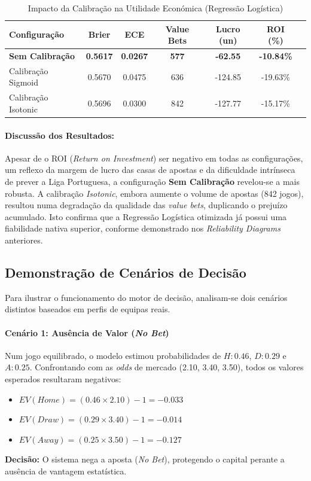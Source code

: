 \documentclass[10pt]{article}
\begin{document}
\begin{table}[H]
\centering
\caption{Impacto da Calibração na Utilidade Económica (Regressão Logística)}
\label{tab:utilidade_comparativa}
\begin{tabular}{lcccccc}
\hline
\textbf{Configuração} & \textbf{Brier} & \textbf{ECE} & \textbf{Value Bets} & \textbf{Lucro (un)} & \textbf{ROI (\%)} \\ \hline
\textbf{Sem Calibração} & \textbf{0.5617} & \textbf{0.0267} & \textbf{577} & \textbf{-62.55} & \textbf{-10.84\%} \\
Calibração Sigmoid & 0.5670 & 0.0475 & 636 & -124.85 & -19.63\% \\
Calibração Isotonic & 0.5696 & 0.0300 & 842 & -127.77 & -15.17\% \\ \hline
\end{tabular}
\end{table}

\paragraph{Discussão dos Resultados:} 
Apesar de o ROI (\textit{Return on Investment}) ser negativo em todas as configurações, um reflexo da margem de lucro das casas de apostas e da dificuldade intrínseca de prever a Liga Portuguesa, a configuração \textbf{Sem Calibração} revelou-se a mais robusta. 
A calibração \textit{Isotonic}, embora aumente o volume de apostas (842 jogos), resultou numa degradação da qualidade das \textit{value bets}, duplicando o prejuízo acumulado. Isto confirma que a Regressão Logística otimizada já possui uma fiabilidade nativa superior, conforme demonstrado nos \textit{Reliability Diagrams} anteriores.

\subsection{Demonstração de Cenários de Decisão}

Para ilustrar o funcionamento do motor de decisão, analisam-se dois cenários distintos baseados em perfis de equipas reais.

\paragraph{Cenário 1: Ausência de Valor (\textit{No Bet})} 
Num jogo equilibrado, o modelo estimou probabilidades de $H: 0.46$, $D: 0.29$ e $A: 0.25$. Confrontando com as \textit{odds} de mercado (2.10, 3.40, 3.50), todos os valores esperados resultaram negativos:
\begin{itemize}
    \item $EV(Home) = (0.46 \times 2.10) - 1 = -0.033$
    \item $EV(Draw) = (0.29 \times 3.40) - 1 = -0.014$
    \item $EV(Away) = (0.25 \times 3.50) - 1 = -0.127$
\end{itemize}
\textbf{Decisão:} O sistema nega a aposta (\textit{No Bet}), protegendo o capital perante a ausência de vantagem estatística.
\end{document}
